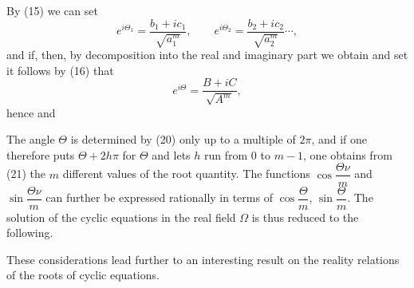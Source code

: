 
By (15) we can set
\[
e^{i\Theta_1} = \frac{b_1 + ic_1}{\sqrt{a_1^m}}, \qquad e^{i\Theta_2} = \frac{b_2 + ic_2}{\sqrt{a_2^m}} \cdots,
\]
and if, then, by decomposition into the real and imaginary part we
obtain
and set
it follows by (16) that
\[
e^{i\Theta} = \frac{B + iC}{\sqrt{A^m}},
\]
hence
and

The angle $\Theta$ is determined by (20) only up to a multiple of
$2\pi$, and if one therefore puts $\Theta + 2h\pi$ for $\Theta$ and lets $h$
run from $0$ to $m - 1$, one obtains from (21) the $m$ different values of the root quantity. The functions $\cos\dfrac{\Theta\nu}{m}$
and $\sin\dfrac{\Theta\nu}{m}$ can further be expressed rationally in terms of $\cos\dfrac{\Theta}{m}$, $\sin\dfrac{\Theta}{m}$. The solution of the cyclic equations in
the real field $\Omega$ is thus reduced to the following.


These considerations lead further to an interesting
result on the reality relations of the roots of cyclic
equations.
